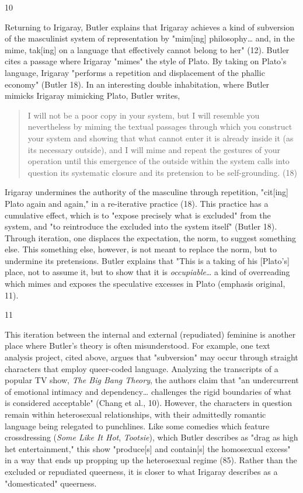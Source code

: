 \documentclass[11pt]{article}
\begin{document}
10

Returning to Irigaray, Butler explains that Irigaray achieves a kind
of subversion of the masculinist system of representation by "mim[ing]
philosophy\ldots{} and, in the mime, tak[ing] on a language that
effectively cannot belong to her" (12). Butler cites a passage where
Irigaray "mimes" the style of Plato. By taking on Plato's language,
Irigaray "performs a repetition and displacement of the phallic
economy" (Butler 18). In an interesting double inhabitation, where
Butler mimicks Irigaray mimicking Plato, Butler writes,
\begin{quote}
I will not be a poor copy in your system, but I will resemble you
nevertheless by miming the textual passages through which you
construct your system and showing that what cannot enter it is already
inside it (as its necessary outside), and I will mime and repeat the
gestures of your operation until this emergence of the outside within
the system calls into question its systematic closure and its
pretension to be self-grounding. (18)
\end{quote}
Irigaray undermines the authority of the masculine through repetition,
"cit[ing] Plato again and again," in a re-iterative practice (18).
This practice has a cumulative effect, which is to "expose precisely
what is excluded" from the system, and "to reintroduce the excluded
into the system itself" (Butler 18). Through iteration, one displaces
the expectation, the norm, to suggest something else. This something
else, however, is not meant to replace the norm, but to undermine its
pretensions. Butler explains that "This is a taking of his [Plato's]
place, not to assume it, but to show that it is \emph{occupiable}\ldots{} a kind
of overreading which mimes and exposes the speculative excesses in
Plato (emphasis original, 11).

11

This iteration between the internal and external (repudiated) feminine
is another place where Butler's theory is often misunderstood. For
example, one text analysis project, cited above, argues that
"subversion" may occur through straight characters that employ
queer-coded language. Analyzing the transcripts of a popular TV show,
\emph{The Big Bang Theory}, the authors claim that "an undercurrent of
emotional intimacy and dependency\ldots{} challenges the rigid boundaries
of what is considered acceptable" (Chang et al., 10). However, the
characters in question remain within heterosexual relationships, with
their admittedly romantic language being relegated to punchlines. Like
some comedies which feature crossdressing (\emph{Some Like It Hot},
\emph{Tootsie}), which Butler describes as "drag as high het
entertainment," this show "produce[s] and contain[s] the homosexual
excess" in a way that ends up propping up the heterosexual regime
(85). Rather than the excluded or repudiated queerness, it is closer
to what Irigaray describes as a "domesticated" queerness.
\end{document}

